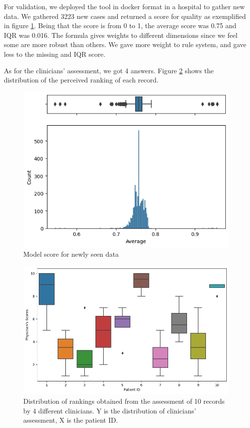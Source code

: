 For validation, we deployed the tool in docker format in a hospital to gather new data. We gathered 3223 new cases and returned a score for quality as exemplified in figure \ref{fig:scores}. Being that the score is from 0 to 1, the average score was 0.75 and IQR was 0.016. The formula gives weights to different dimensions since we feel some are more robust than others. We gave more weight to rule system, and gave less to the missing and IQR score.

As for the clinicians' assessment, we got 4 answers. Figure \ref{fig:clinical-dq} shows the distribution of the perceived ranking of each record.


\begin{figure}[htbp]
\centering
\caption{Model score for newly seen data}\label{fig:scores} 
\includegraphics[scale=0.78]{figures/Scoring_V2.png}
\end{figure}

\begin{figure}[htbp]
\centering
\caption{Distribution of rankings obtained from the assessment of 10 records by 4 different clinicians. Y is the distribution of clinicians' assessment, X is the patient ID.}\label{fig:clinical-dq} 
\includegraphics[scale=0.52]{figures/clinical_assessment_no_model.png}
\end{figure}

